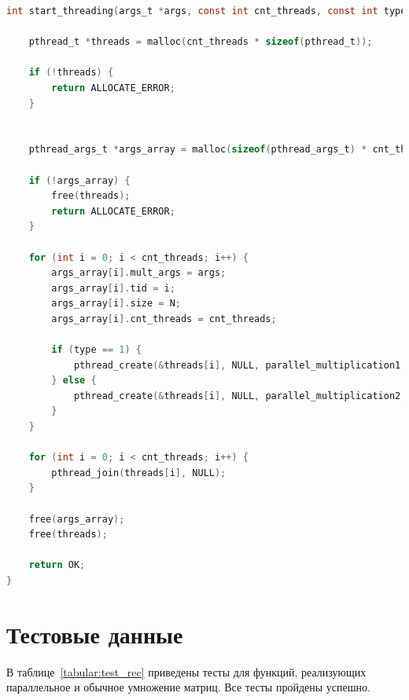 \documentclass[12pt]{report}
\begin{document}
\begin{lstlisting}[label=some-code,caption=Функция создания потоков,language=C]
int start_threading(args_t *args, const int cnt_threads, const int type) {

	pthread_t *threads = malloc(cnt_threads * sizeof(pthread_t));

	if (!threads) {
		return ALLOCATE_ERROR;
	}


	pthread_args_t *args_array = malloc(sizeof(pthread_args_t) * cnt_threads);

	if (!args_array) {
		free(threads);
		return ALLOCATE_ERROR;
	}

	for (int i = 0; i < cnt_threads; i++) {
		args_array[i].mult_args = args;
		args_array[i].tid = i;
		args_array[i].size = N;
		args_array[i].cnt_threads = cnt_threads;

		if (type == 1) {
			pthread_create(&threads[i], NULL, parallel_multiplication1, &args_array[i]);
		} else {
			pthread_create(&threads[i], NULL, parallel_multiplication2, &args_array[i]);
		}
	}

	for (int i = 0; i < cnt_threads; i++) {
		pthread_join(threads[i], NULL);
	}

	free(args_array);
	free(threads);

	return OK;
}

\end{lstlisting}

\section{Тестовые данные}

В таблице~\ref{tabular:test_rec} приведены тесты для функций, реализующих параллельное и обычное умножение матриц. Все тесты пройдены успешно.
\end{document}
